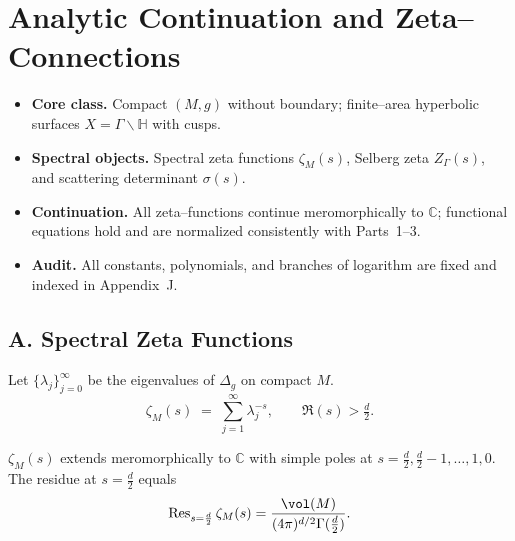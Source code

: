 
\section{Analytic Continuation and Zeta–Connections}
\label{sec:analytic-zeta}

\begin{tcolorbox}[colback=gray!5,colframe=gray!35,
  title=Scope \& Assumptions (ZNB-9+++ • enforced)]
\begin{itemize}
  \item \textbf{Core class.} Compact $(M,g)$ without boundary; finite–area hyperbolic surfaces $X=\Gamma\backslash\mathbb H$ with cusps.
  \item \textbf{Spectral objects.} Spectral zeta functions $\zeta_M(s)$, Selberg zeta $Z_\Gamma(s)$, and scattering determinant $\sigma(s)$.
  \item \textbf{Continuation.} All zeta–functions continue meromorphically to $\mathbb C$; functional equations hold and are normalized consistently with Parts~1–3.
  \item \textbf{Audit.} All constants, polynomials, and branches of logarithm are fixed and indexed in Appendix~J.
\end{itemize}
\end{tcolorbox}

\subsection*{A. Spectral Zeta Functions}
\label{subsec:spectral-zeta}

\begin{definition}
Let $\{\lambda_j\}_{j=0}^\infty$ be the eigenvalues of $\Delta_g$ on compact $M$.
\[
   \zeta_M(s) \;=\; \sum_{j=1}^\infty \lambda_j^{-s}, \qquad \Re(s)>\tfrac d2.
\]
\end{definition}

\begin{theorem}
\label{thm:zetaM-cont}
$\zeta_M(s)$ extends meromorphically to $\mathbb C$ with simple poles at
$s=\tfrac d2,\tfrac d2-1,\ldots,1,0$. The residue at $s=\tfrac d2$ equals
\[
  \operatorname{Res}_{s=\frac d2}\zeta_M(s)=\frac{\vol(M)}{(4\pi)^{d/2}\Gamma(\tfrac d2)}.
\]
\end{theorem}

